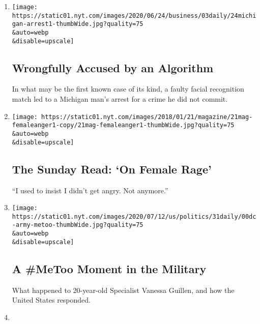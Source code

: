 \begin{enumerate}
\def\labelenumi{\arabic{enumi}.}
\item
  \href{/2020/08/03/podcasts/the-daily/algorithmic-justice-racism.html}{}

  \texttt{[image: https://static01.nyt.com/images/2020/06/24/business/03daily/24michigan-arrest1-thumbWide.jpg?quality=75\\\&auto=webp\\\&disable=upscale]}

  \hypertarget{wrongfully-accused-by-an-algorithm}{%
  \subsection{Wrongfully Accused by an
  Algorithm}\label{wrongfully-accused-by-an-algorithm}}

  In what may be the first known case of its kind, a faulty facial
  recognition match led to a Michigan man's arrest for a crime he did
  not commit.
\item
  \href{/2020/08/02/podcasts/the-daily/on-female-rage.html}{}

  \texttt{[image: https://static01.nyt.com/images/2018/01/21/magazine/21mag-femaleanger1-copy/21mag-femaleanger1-thumbWide.jpg?quality=75\\\&auto=webp\\\&disable=upscale]}

  \hypertarget{the-sunday-read-on-female-rage}{%
  \subsection{The Sunday Read: `On Female
  Rage'}\label{the-sunday-read-on-female-rage}}

  ``I used to insist I didn't get angry. Not anymore.''
\item
  \href{/2020/07/31/podcasts/the-daily/vanessa-guillen-military-metoo.html}{}

  \texttt{[image: https://static01.nyt.com/images/2020/07/12/us/politics/31daily/00dc-army-metoo-thumbWide.jpg?quality=75\\\&auto=webp\\\&disable=upscale]}

  \hypertarget{a-metoo-moment-in-the-military}{%
  \subsection{A \#MeToo Moment in the
  Military}\label{a-metoo-moment-in-the-military}}

  What happened to 20-year-old Specialist Vanessa Guillen, and how the
  United States responded.
\item
  \href{/2020/07/30/podcasts/the-daily/congress-facebook-amazon-google-apple.html}{}


\end{enumerate}
